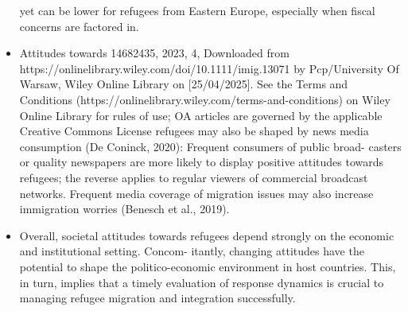 \documentclass{beamer}
\begin{document}
\begin{frame}
\begin{itemize}
      yet can be lower for refugees from Eastern Europe, especially when fiscal concerns are factored in.
      \item Attitudes towards
      14682435, 2023, 4, Downloaded from https://onlinelibrary.wiley.com/doi/10.1111/imig.13071 by Pcp/University Of Warsaw, Wiley Online Library on [25/04/2025]. See the Terms and Conditions (https://onlinelibrary.wiley.com/terms-and-conditions) on Wiley Online Library for rules of use; OA articles are governed by the applicable Creative Commons License
      refugees may also be shaped by news media consumption (De Coninck, 2020): Frequent consumers of public broad-
      casters or quality newspapers are more likely to display positive attitudes towards refugees; the reverse applies to
      regular viewers of commercial broadcast networks. Frequent media coverage of migration issues may also increase
      immigration worries (Benesch et al., 2019).
      \item Overall, societal attitudes towards refugees depend strongly on the economic and institutional setting. Concom-
      itantly, changing attitudes have the potential to shape the politico-economic environment in host countries. This, in
      turn, implies that a timely evaluation of response dynamics is crucial to managing refugee migration and integration
      successfully.
   \end{itemize}

\end{frame}
\end{document}
